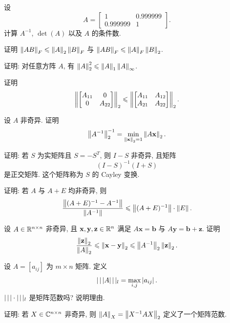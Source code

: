 \begin{exercises}
  \item 设
  \[
    A=
    \begin{bmatrix}
      1 & 0.999999\\
      0.999999 & 1
    \end{bmatrix}.
  \]
  计算 $A^{-1}$, $\det(A)$ 以及 $A$ 的条件数.

  \item 证明 $\left\|AB\right\|_F\leqslant\left\|A\right\|_2\left\|B\right\|_F$ 与 $\left\|AB\right\|_F\leqslant\left\|A\right\|_F\left\|B\right\|_2$.

  \item 证明: 对任意方阵 $A$, 有 $\left\|A\right\|_2^2\leqslant\left\|A\right\|_1\left\|A\right\|_\infty$.

  \item 证明
  \[
    \left\|
    \begin{bmatrix}
      A_{11} & 0\\
      0 & A_{22}
    \end{bmatrix}\right\|_2
    \leqslant
    \left\|
    \begin{bmatrix}
      A_{11} & A_{12}\\
      A_{21} & A_{22}
    \end{bmatrix}\right\|_2.
  \]

  \item 设 $A$ 非奇异. 证明
  \[
    \left\|A^{-1}\right\|_2^{-1}=\min_{\left\|\mathbf{x}\right\|_2=1}\left\|A\mathbf{x}\right\|_2.
  \]

  \item 证明: 若 $S$ 为实矩阵且 $S=-S^T$, 则 $I-S$ 非奇异, 且矩阵
  \[
    (I-S)^{-1}(I+S)
  \]
  是正交矩阵. 这个矩阵称为 $S$ 的 Cayley 变换.

  \item 证明: 若 $A$ 与 $A+E$ 均非奇异, 则
  \[
    \frac{\left\|(A+E)^{-1}-A^{-1}\right\|}{\left\|A^{-1}\right\|}
    \leqslant\left\|(A+E)^{-1}\right\|\cdot\left\|E\right\|.
  \]

  \item 设 $A\in\mathbb{R}^{n\times n}$ 非奇异, 且 $\mathbf{x},\mathbf{y},\mathbf{z}\in\mathbb{R}^n$ 满足 $A\mathbf{x}=\mathbf{b}$ 与 $A\mathbf{y}=\mathbf{b}+\mathbf{z}$. 证明
  \[
    \frac{\left\|\mathbf{z}\right\|_2}{\left\|A\right\|_2}
    \leqslant\left\|\mathbf{x}-\mathbf{y}\right\|_2
    \leqslant\left\|A^{-1}\right\|_2\left\|\mathbf{z}\right\|_2.
  \]

  \item 设 $A=[a_{ij}]$ 为 $m\times n$ 矩阵. 定义
  \[
    \vert\mkern2.5mu\vert\mkern2.5mu\vert A\vert\mkern2.5mu\vert\mkern2.5mu\vert_l=\max_{i,j}\left|a_{ij}\right|.
  \]
  $\vert\mkern2.5mu\vert\mkern2.5mu\vert \cdot\vert\mkern2.5mu\vert\mkern2.5mu\vert_l$ 是矩阵范数吗? 说明理由.

  \item 证明: 若 $X\in\mathbb{C}^{n\times n}$ 非奇异, 则 $\left\|A\right\|_X=\left\|X^{-1}AX\right\|_2$ 定义了一个矩阵范数.


\end{exercises}
